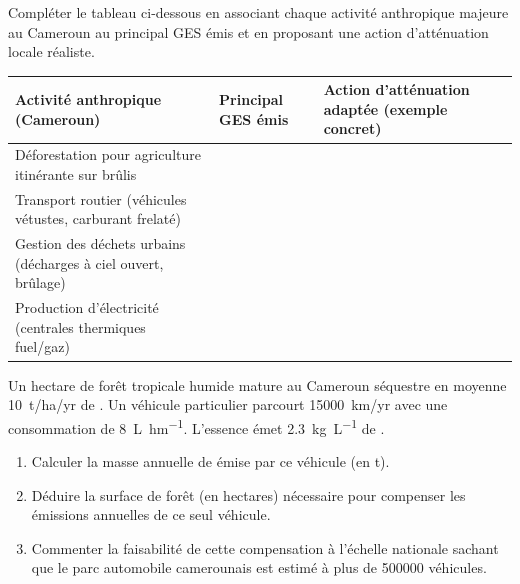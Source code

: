 \documentclass[11pt]{article}
\begin{document}
\begin{exercice}
\label{exo:tableau}
Compléter le tableau ci-dessous en associant chaque activité anthropique majeure au Cameroun au principal GES émis et en proposant une action d'atténuation locale réaliste.

\begin{tabularx}{\linewidth}{|>{\hsize=1.2\hsize}X|>{\hsize=1.0\hsize}X|>{\hsize=1.8\hsize}X|}
\hline
\textbf{Activité anthropique (Cameroun)} & \textbf{Principal GES émis} & \textbf{Action d'atténuation adaptée (exemple concret)} \\
\hline
Déforestation pour agriculture itinérante sur brûlis & \dotfill & \dotfill \\
\hline
Transport routier (véhicules vétustes, carburant frelaté) & \dotfill & \dotfill \\
\hline
Gestion des déchets urbains (décharges à ciel ouvert, brûlage) & \dotfill & \dotfill \\
\hline
Production d'électricité (centrales thermiques fuel/gaz) & \dotfill & \dotfill \\
\hline
\end{tabularx}
\end{exercice}

\begin{exercice}
\label{exo:calcul}
Un hectare de forêt tropicale humide mature au Cameroun séquestre en moyenne \SI{10}{t/ha/yr} de . Un véhicule particulier parcourt \SI{15000}{km/yr} avec une consommation de \SI{8}{\liter\per\hecto\meter}. L'essence émet \SI{2.3}{\kilo\gram\per\liter} de .
\begin{enumerate}
    \item Calculer la masse annuelle de  émise par ce véhicule (en \si{\tonne}).
    \item Déduire la surface de forêt (en hectares) nécessaire pour compenser les émissions annuelles de ce seul véhicule.
    \item Commenter la faisabilité de cette compensation à l'échelle nationale sachant que le parc automobile camerounais est estimé à plus de \num{500000} véhicules.
\end{enumerate}
\end{exercice}
\end{document}
